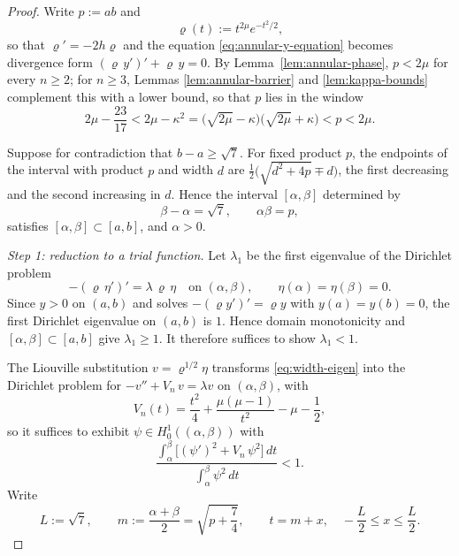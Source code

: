 \documentclass[10pt,a4paper]{amsart}
\begin{document}
\begin{proof}
Write $p:=ab$ and
\[
    \varrho(t):=t^{2\mu}e^{-t^2/2},
\]
so that $\varrho'=-2h\varrho$ and the equation \eqref{eq:annular-y-equation} becomes divergence form $(\varrho\,y')'+\varrho\,y=0$. By Lemma~\ref{lem:annular-phase}, $p<2\mu$ for every $n\geq2$; for $n\geq3$, Lemmas \ref{lem:annular-barrier} and \ref{lem:kappa-bounds} complement this with a lower bound, so that $p$ lies in the window
\begin{equation}\label{eq:product-window}
    2\mu-\frac{23}{17}
    <2\mu-\kappa^2
    =\bigl(\sqrt{2\mu}-\kappa\bigr)\bigl(\sqrt{2\mu}+\kappa\bigr)
    <p<2\mu.
\end{equation}

Suppose for contradiction that $b-a\geq\sqrt7$. For fixed product $p$, the endpoints of the interval with product $p$ and width $d$ are $\frac12\bigl(\sqrt{d^2+4p}\mp d\bigr)$, the first decreasing and the second increasing in $d$. Hence the interval $[\alpha,\beta]$ determined by
\[
    \beta-\alpha=\sqrt7,
    \qquad
    \alpha\beta=p,
\]
satisfies $[\alpha,\beta]\subset[a,b]$, and $\alpha>0$.

\emph{Step 1: reduction to a trial function.} Let $\lambda_1$ be the first eigenvalue of the Dirichlet problem
\begin{equation}\label{eq:width-eigen}
    -(\varrho\,\eta')'=\lambda\,\varrho\,\eta
    \quad\text{on }(\alpha,\beta),
    \qquad
    \eta(\alpha)=\eta(\beta)=0.
\end{equation}
Since $y>0$ on $(a,b)$ and solves $-(\varrho y')'=\varrho y$ with $y(a)=y(b)=0$, the first Dirichlet eigenvalue on $(a,b)$ is $1$. Hence domain monotonicity and $[\alpha,\beta]\subset[a,b]$ give $\lambda_1\geq1$. It therefore suffices to show $\lambda_1<1$.

The Liouville substitution $v=\varrho^{1/2}\eta$ transforms \eqref{eq:width-eigen} into the Dirichlet problem for $-v''+V_n\,v=\lambda v$ on $(\alpha,\beta)$, with
\begin{equation}\label{eq:width-potential}
    V_n(t)=\frac{t^2}{4}+\frac{\mu(\mu-1)}{t^2}-\mu-\frac12,
\end{equation}
so it suffices to exhibit $\psi\in H^1_0((\alpha,\beta))$ with
\begin{equation}\label{eq:width-rayleigh}
    \frac{\displaystyle\int_\alpha^\beta\bigl[(\psi')^2+V_n\,\psi^2\bigr]\,dt}
         {\displaystyle\int_\alpha^\beta\psi^2\,dt}<1 .
\end{equation}
Write
\[
    L:=\sqrt7,
    \qquad
    m:=\frac{\alpha+\beta}2=\sqrt{p+\frac74},
    \qquad
    t=m+x,
    \quad
    -\frac L2\leq x\leq\frac L2 .
\]


\end{proof}
\end{document}
